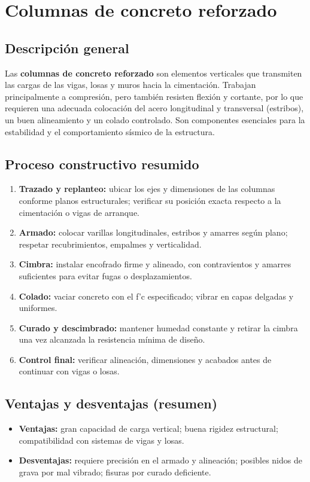 \documentclass[12pt]{article}
\begin{document}
	
	
	
	
	
	\section{Columnas de concreto reforzado}
	
	\subsection*{Descripción general}
	Las \textbf{columnas de concreto reforzado} son elementos verticales que transmiten las cargas de las vigas, losas y muros hacia la cimentación. Trabajan principalmente a compresión, pero también resisten flexión y cortante, por lo que requieren una adecuada colocación del acero longitudinal y transversal (estribos), un buen alineamiento y un colado controlado. Son componentes esenciales para la estabilidad y el comportamiento sísmico de la estructura.
	
	\subsection*{Proceso constructivo resumido}
	\begin{enumerate}[leftmargin=*, itemsep=2pt]
		\item \textbf{Trazado y replanteo:} ubicar los ejes y dimensiones de las columnas conforme planos estructurales; verificar su posición exacta respecto a la cimentación o vigas de arranque.
		\item \textbf{Armado:} colocar varillas longitudinales, estribos y amarres según plano; respetar recubrimientos, empalmes y verticalidad.
		\item \textbf{Cimbra:} instalar encofrado firme y alineado, con contravientos y amarres suficientes para evitar fugas o desplazamientos.
		\item \textbf{Colado:} vaciar concreto con el f’c especificado; vibrar en capas delgadas y uniformes.
		\item \textbf{Curado y descimbrado:} mantener humedad constante y retirar la cimbra una vez alcanzada la resistencia mínima de diseño.
		\item \textbf{Control final:} verificar alineación, dimensiones y acabados antes de continuar con vigas o losas.
	\end{enumerate}
	
	\subsection*{Ventajas y desventajas (resumen)}
	\begin{itemize}[leftmargin=*, itemsep=2pt]
		\item \textbf{Ventajas:} gran capacidad de carga vertical; buena rigidez estructural; compatibilidad con sistemas de vigas y losas.
		\item \textbf{Desventajas:} requiere precisión en el armado y alineación; posibles nidos de grava por mal vibrado; fisuras por curado deficiente.
	\end{itemize}
	
\end{document}
